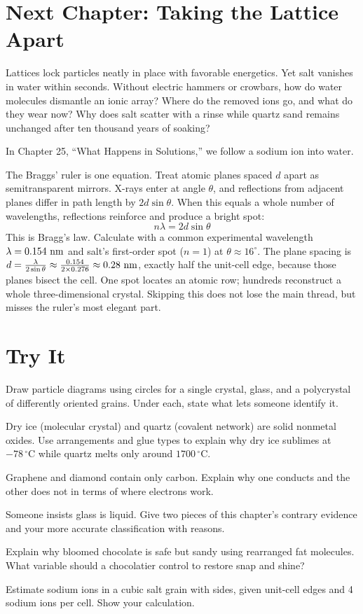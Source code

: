 \section{Next Chapter: Taking the Lattice Apart}

Lattices lock particles neatly in place with favorable energetics. Yet salt vanishes in water within seconds. Without electric hammers or crowbars, how do water molecules dismantle an ionic array? Where do the removed ions go, and what do they wear now? Why does salt scatter with a rinse while quartz sand remains unchanged after ten thousand years of soaking?

In Chapter 25, ``What Happens in Solutions,'' we follow a sodium ion into water.

\begin{tiaozhan}
The Braggs' ruler is one equation. Treat atomic planes spaced $d$ apart as semitransparent mirrors. X-rays enter at angle $\theta$, and reflections from adjacent planes differ in path length by $2d\sin\theta$. When this equals a whole number of wavelengths, reflections reinforce and produce a bright spot:
\[
n\lambda = 2d\sin\theta
\]
This is Bragg's law. Calculate with a common experimental wavelength $\lambda = 0.154\ \mathrm{nm}$ and salt's first-order spot ($n=1$) at $\theta \approx 16^{\circ}$. The plane spacing is $d = \frac{\lambda}{2\sin\theta} \approx \frac{0.154}{2\times 0.276} \approx 0.28\ \mathrm{nm}$, exactly half the  unit-cell edge, because those planes bisect the cell. One spot locates an atomic row; hundreds reconstruct a whole three-dimensional crystal. Skipping this does not lose the main thread, but misses the ruler's most elegant part.
\end{tiaozhan}

\section*{Try It}

\begin{sikaoti}
\item Draw particle diagrams using circles for a single crystal, glass, and a polycrystal of differently oriented grains. Under each, state what lets someone identify it.
\item Dry ice (molecular crystal) and quartz (covalent network) are solid nonmetal oxides. Use arrangements and glue types to explain why dry ice sublimes at $-78\,^{\circ}\mathrm{C}$ while quartz melts only around $1700\,^{\circ}\mathrm{C}$.
\item Graphene and diamond contain only carbon. Explain why one conducts and the other does not in terms of where electrons work.
\item Someone insists glass is liquid. Give two pieces of this chapter's contrary evidence and your more accurate classification with reasons.
\item Explain why bloomed chocolate is safe but sandy using rearranged fat molecules. What variable should a chocolatier control to restore snap and shine?
\item Estimate sodium ions in a cubic salt grain with  sides, given  unit-cell edges and 4 sodium ions per cell. Show your calculation.
\end{sikaoti}
